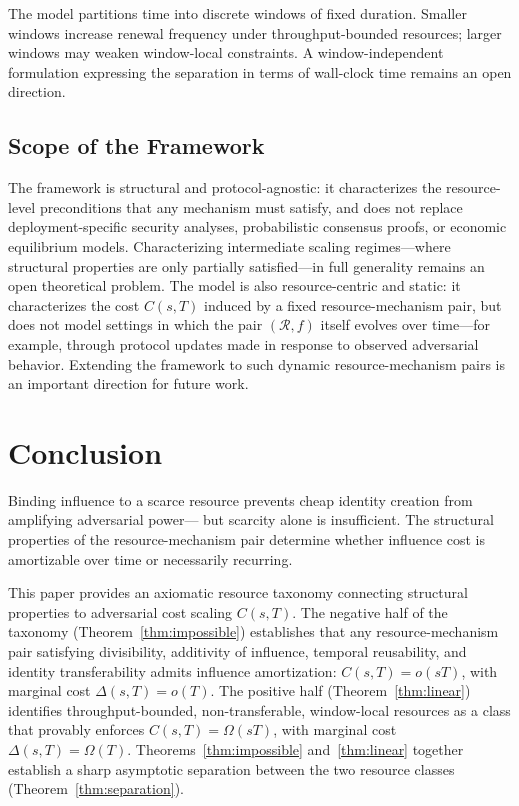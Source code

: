 \documentclass[manuscript,review]{acmart}
\theoremstyle{remark}
\begin{document}
	The model partitions time into discrete windows of
	fixed duration.
	Smaller windows increase renewal frequency under
	throughput-bounded resources; larger windows may
	weaken window-local constraints.
	A window-independent formulation expressing the
	separation in terms of wall-clock time remains an
	open direction.
	
	\subsection{Scope of the Framework}
	\label{ssec:lim_scope}
	
	The framework is structural and protocol-agnostic:
	it characterizes the resource-level preconditions
	that any mechanism must satisfy, and does not replace
	deployment-specific security analyses, probabilistic
	consensus proofs, or economic equilibrium models.
	Characterizing intermediate scaling regimes---where
	structural properties are only partially satisfied---in
	full generality remains an open theoretical problem.
	The model is also resource-centric and static: it
	characterizes the cost $C(s,T)$ induced by a fixed
	resource-mechanism pair, but does not model settings
	in which the pair $(\mathcal{R}, f)$ itself evolves
	over time---for example, through protocol updates
	made in response to observed adversarial behavior.
	Extending the framework to such dynamic
	resource-mechanism pairs is an important direction
	for future work.
	\section{Conclusion}
	\label{sec:conclusion}
	
	Binding influence to a scarce resource prevents cheap
	identity creation from amplifying adversarial power---
	but scarcity alone is insufficient.
	The structural properties of the resource-mechanism pair
	determine whether influence cost is amortizable over time
	or necessarily recurring.
	
	This paper provides an axiomatic resource taxonomy
	connecting structural properties to adversarial cost
	scaling $C(s,T)$.
	The negative half of the taxonomy (Theorem~\ref{thm:impossible})
	establishes that any resource-mechanism pair satisfying
	divisibility, additivity of influence, temporal reusability,
	and identity transferability admits influence amortization:
	$C(s,T) = o(sT)$, with marginal cost $\Delta(s,T) = o(T)$.
	The positive half (Theorem~\ref{thm:linear}) identifies
	throughput-bounded, non-transferable, window-local resources
	as a class that provably enforces $C(s,T) = \Omega(sT)$,
	with marginal cost $\Delta(s,T) = \Omega(T)$.
	Theorems~\ref{thm:impossible} and~\ref{thm:linear}
	together establish a sharp asymptotic separation
	between the two resource classes
	(Theorem~\ref{thm:separation}).
	
\end{document}
